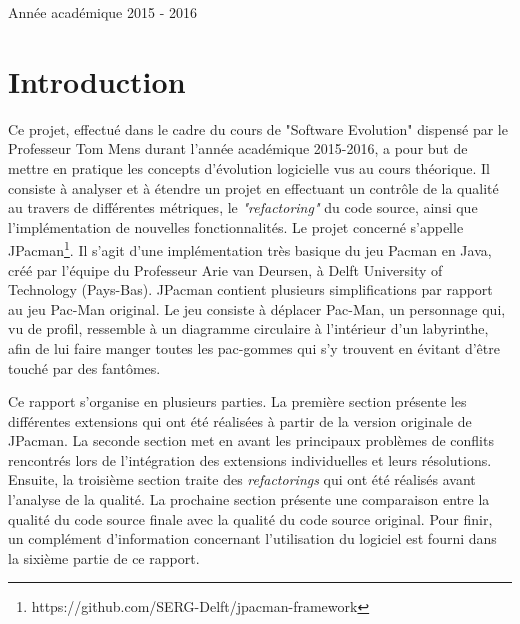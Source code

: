 \documentclass[12pt, openany]{report}
\begin{document}
\begin{titlepage}
\begin{sffamily}
\begin{center}
    \vfill

    {\large Année académique 2015 - 2016}
	
  \end{center}
  \end{sffamily}
\end{titlepage}


	\setcounter{secnumdepth}{3}
	\setcounter{tocdepth}{3}

\newpage

	\renewcommand{\thesection}{\arabic{section}}
	\tableofcontents
	\newpage

	

\section{Introduction}
Ce projet, effectué dans le cadre du cours de "Software Evolution" dispensé par le Professeur Tom Mens durant l'année académique 2015-2016, a pour but de mettre en pratique les concepts d'évolution logicielle vus au cours théorique. Il consiste à analyser et à étendre un projet en effectuant un contrôle de la qualité au travers de différentes métriques, le \textit{"refactoring"} du code source, ainsi que l'implémentation de nouvelles fonctionnalités. Le projet concerné s'appelle JPacman\footnote{https://github.com/SERG-Delft/jpacman-framework}. Il s'agit d'une implémentation très basique du jeu Pacman en Java, créé par l'équipe  du Professeur Arie van Deursen, à Delft University of Technology (Pays-Bas).
 JPacman contient plusieurs simplifications par rapport au jeu Pac-Man original. Le jeu consiste à déplacer Pac-Man, un personnage qui, vu de profil, ressemble à un diagramme circulaire à l’intérieur d’un labyrinthe, afin de lui faire manger toutes les pac-gommes qui s’y trouvent en évitant d’être touché par des fantômes.
 
Ce rapport s'organise en plusieurs parties. La première section présente les différentes extensions qui ont été réalisées à partir de la version originale de JPacman. La seconde section met en avant les principaux problèmes de conflits rencontrés lors de l'intégration des extensions individuelles et leurs résolutions. Ensuite, la troisième section traite des \textit{refactorings} qui ont été réalisés avant l'analyse de la qualité. La prochaine section présente une comparaison entre la qualité du code source finale avec la qualité du code source original. Pour finir, un complément d'information concernant l'utilisation du logiciel est fourni dans la sixième partie de ce rapport. 
\end{document}

